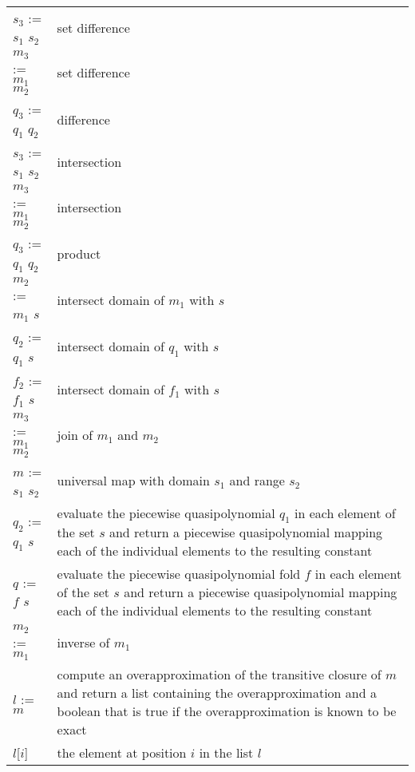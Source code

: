 \begin{supertabular}{lp{0.7\textwidth}}
$s_3$ := $s_1$ \ai{$-$} $s_2$ & set difference
\\
$m_3$ := $m_1$ \ai{$-$} $m_2$ & set difference
\\
$q_3$ := $q_1$ \ai{$-$} $q_2$ & difference
\\
$s_3$ := $s_1$ \ai{$*$} $s_2$ & intersection
\\
$m_3$ := $m_1$ \ai{$*$} $m_2$ & intersection
\\
$q_3$ := $q_1$ \ai{$*$} $q_2$ & product
\\
$m_2$ := $m_1$ \ai{$*$} $s$ & intersect domain of $m_1$ with $s$
\\
$q_2$ := $q_1$ \ai{$*$} $s$ & intersect domain of $q_1$ with $s$
\\
$f_2$ := $f_1$ \ai{$*$} $s$ & intersect domain of $f_1$ with $s$
\\
$m_3$ := $m_1$  $m_2$ & join of $m_1$ and $m_2$
\\
$m$ := $s_1$ \ai[\tt]{->} $s_2$ & universal map with domain $s_1$
and range $s_2$
\\
$q_2$ := $q_1$  $s$ &
evaluate the piecewise quasipolynomial $q_1$ in each element
of the set $s$ and return a piecewise quasipolynomial
mapping each of the individual elements to the resulting
constant
\\
$q$ := $f$  $s$ &
evaluate the piecewise quasipolynomial fold $f$ in each element
of the set $s$ and return a piecewise quasipolynomial
mapping each of the individual elements to the resulting
constant
\\
$m_2$ := $m_1$ & inverse of $m_1$
\\
$l$ := $m$\ai[\tt]{\^{}+} &
compute an overapproximation of the transitive closure
of $m$ and return a list containing the overapproximation
and a boolean that is true if the overapproximation
is known to be exact
\\
$l$[$i$] &
the element at position $i$ in the list $l$
\\
\end{supertabular}
